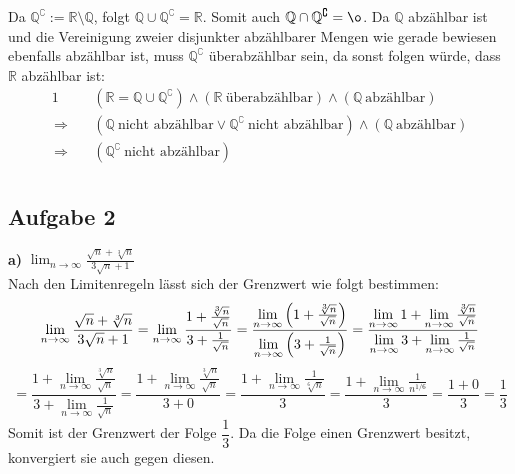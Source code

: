 \documentclass[a4paper,graphics,11pt]{article}
\newcommand{\aufgabe}[1]{\subsection*{Aufgabe #1}}
\begin{document}
Da $\mathbb{Q}^\complement := \mathbb{R}\setminus \mathbb{Q}$, folgt $\mathbb{Q} \cup \mathbb{Q}^\complement = \mathbb{R}$. Somit auch $\mathbb{Q} \cap \mathbb{Q}^\complement = \o$.
Da $\mathbb{Q}$ abzählbar ist und die Vereinigung zweier disjunkter abzählbarer Mengen
wie gerade bewiesen ebenfalls abzählbar ist, muss $\mathbb{Q}^\complement$ überabzählbar sein, da sonst folgen würde, dass $\mathbb{R}$ abzählbar ist:
\begin{alignat*}{1}
    &(\mathbb{R} = \mathbb{Q} \cup \mathbb{Q}^\complement)
    \land(\mathbb{R}\ \text{überabzählbar}) \land (\mathbb{Q}\ \text{abzählbar})\\
    \,\Longrightarrow\quad&(\mathbb{Q}\ \text{nicht abzählbar} \lor \mathbb{Q}^\complement\ \text{nicht abzählbar}) \land (\mathbb{Q}\ \text{abzählbar})\\
    \,\Longrightarrow\quad&(\mathbb{Q}^\complement\ \text{nicht abzählbar})\\
\end{alignat*}

\newpage
\aufgabe{2}
\textbf{a)} $\lim_{n \to \infty}\limits \frac{\sqrt{n} + \sqrt[3]{n}}{3\sqrt{n} +1}$\\[5pt]
Nach den Limitenregeln lässt sich der Grenzwert wie folgt bestimmen:
$$
    \lim_{n \to \infty} \frac{\sqrt{n} + \sqrt[3]{n}}{3\sqrt{n} +1}
    = \lim_{n \to \infty}\limits \frac{1+\frac{\sqrt[3]{n}}{\sqrt{n}}}{3+\frac{1}{\sqrt{n}}}
    = \frac{\lim_{n \to \infty}\limits\left(1+\frac{\sqrt[3]{n}}{\sqrt{n}}\right)}{\lim_{n \to \infty}\limits\left(3+\frac{1}{\sqrt{n}}\right)}
    = \frac{\lim_{n \to \infty}\limits 1+ \lim_{n \to \infty}\limits\frac{\sqrt[3]{n}}{\sqrt{n}}}{\lim_{n \to \infty}\limits3+\lim_{n \to \infty}\limits\frac{1}{\sqrt{n}}}\\[10pt]
$$
$$
    = \frac{1+ \lim_{n \to \infty}\limits\frac{\sqrt[3]{n}}{\sqrt{n}}}{3+\lim_{n \to \infty}\limits\frac{1}{\sqrt{n}}}
    = \frac{1+ \lim_{n \to \infty}\limits\frac{\sqrt[3]{n}}{\sqrt{n}}}{3+0}
    = \frac{1+ \lim_{n \to \infty}\limits\frac{1}{\sqrt[6]{n}}}{3}
    = \frac{1+ \lim_{n \to \infty}\limits\frac{1}{n^{1/6}}}{3}
    = \frac{1+0}{3}
    = \frac{1}{3}
$$
Somit ist der Grenzwert der Folge $\dfrac{1}{3}$. Da die Folge einen Grenzwert besitzt, konvergiert sie auch gegen diesen.
\end{document}
